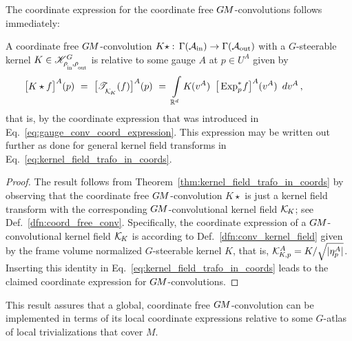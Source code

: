


The coordinate expression for the coordinate free $G\mkern-1.4muM$-convolutions follows immediately:
\begin{thm}
\label{thm:gauge_equiv_conv_from_coordinate_free}
    A coordinate free $G\mkern-1.4muM$-convolution
    $K\star:\, \Gamma(\mathcal{A}_\textup{in}) \to \Gamma(\mathcal{A}_\textup{out})$
    with a $G$-steerable kernel $K\in\KG$ is relative to some gauge $A$ at $p\in U^A$ given by
    \begin{align}
        &\mkern-40mu
        \big[ K\star f \big]^A (p)
        \ =\ \big[ \TKK(f) \big]^A(p)
        \ =\ \int\limits_{\R^d}
            K \mkern-1mu (v^A) \,\ 
            \big[ \Expspf \big]^A (v^A)
            \,\ dv^A \,,
    \end{align}
    that is, by the coordinate expression that was introduced in Eq.~\eqref{eq:gauge_conv_coord_expression}.
    This expression may be written out further as done for general kernel field transforms in Eq.~\eqref{eq:kernel_field_trafo_in_coords}.
\end{thm}
\begin{proof}
    The result follows from Theorem~\ref{thm:kernel_field_trafo_in_coords} by observing that the coordinate free $G\mkern-1.4muM$-convolution $K\star$ is just a kernel field transform with the corresponding $G\mkern-1.4muM$-convolutional kernel field $\mathcal{K}_{\mkern-2mu K}$; see Def.~\ref{dfn:coord_free_conv}.
    Specifically, the coordinate expression of a $G\mkern-1.4muM$-convolutional kernel field $\mathcal{K}_{\mkern-2mu K}$ is according to Def.~\ref{dfn:conv_kernel_field} given by the frame volume normalized $G$-steerable kernel $K$, that is, $\mathcal{K}_{\mkern-2mu K \mkern-2mu, p}^A = K/ \sqrt{|\eta_p^A|}$.
    Inserting this identity in Eq.~\eqref{eq:kernel_field_trafo_in_coords} leads to the claimed coordinate expression for $G\mkern-1.4muM$-convolutions.
\end{proof}

This result assures that a global, coordinate free $G\mkern-1.4muM$-convolution can be implemented in terms of its local coordinate expressions relative to some $G$-atlas of local trivializations that cover $M$.


